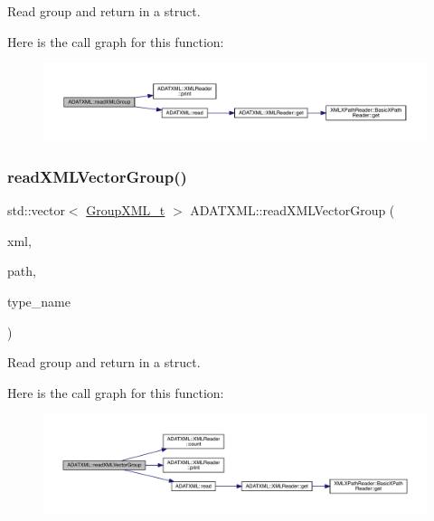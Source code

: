 Read group and return in a struct. 

Here is the call graph for this function\+:\nopagebreak
\begin{figure}[H]
\begin{center}
\leavevmode
\includegraphics[width=350pt]{d2/da3/group__io_ga55d25898ac653a77ea446bee3682d29b_cgraph}
\end{center}
\end{figure}
\mbox{\label{group__io_ga3cd8ca33a23f0e4eafde989d168b8247}} 
\subsubsection{\texorpdfstring{readXMLVectorGroup()}{readXMLVectorGroup()}}
{\footnotesize\ttfamily std\+::vector$<$ \mbox{\hyperlink{structADATXML_1_1GroupXML__t}{Group\+X\+M\+L\+\_\+t}} $>$ A\+D\+A\+T\+X\+M\+L\+::read\+X\+M\+L\+Vector\+Group (\begin{DoxyParamCaption}\item[{\mbox{\hyperlink{classADATXML_1_1XMLReader}{X\+M\+L\+Reader}} \&}]{xml,  }\item[{const std\+::string \&}]{path,  }\item[{const std\+::string \&}]{type\+\_\+name }\end{DoxyParamCaption})}



Read group and return in a struct. 

Here is the call graph for this function\+:\nopagebreak
\begin{figure}[H]
\begin{center}
\leavevmode
\includegraphics[width=350pt]{d2/da3/group__io_ga3cd8ca33a23f0e4eafde989d168b8247_cgraph}
\end{center}
\end{figure}
\mbox{\label{group__io_ga0b5b9fff1a99b7e41bb286c7c153ff78}} 
